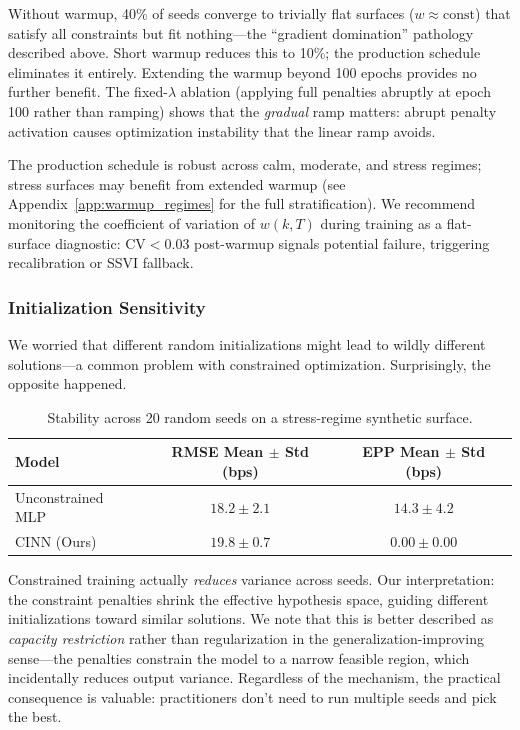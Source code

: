 \documentclass[11pt,a4paper]{article}
\begin{document}
Without warmup, 40\% of seeds converge to trivially flat surfaces ($w \approx \text{const}$) that satisfy all constraints but fit nothing---the ``gradient domination'' pathology described above. Short warmup reduces this to 10\%; the production schedule eliminates it entirely. Extending the warmup beyond 100 epochs provides no further benefit. The fixed-$\lambda$ ablation (applying full penalties abruptly at epoch 100 rather than ramping) shows that the \textit{gradual} ramp matters: abrupt penalty activation causes optimization instability that the linear ramp avoids.

The production schedule is robust across calm, moderate, and stress regimes; stress surfaces may benefit from extended warmup (see Appendix~\ref{app:warmup_regimes} for the full stratification). We recommend monitoring the coefficient of variation of $w(k, T)$ during training as a flat-surface diagnostic: $\text{CV} < 0.03$ post-warmup signals potential failure, triggering recalibration or SSVI fallback.

\subsubsection{Initialization Sensitivity}

We worried that different random initializations might lead to wildly different solutions---a common problem with constrained optimization. Surprisingly, the opposite happened.

\begin{table}[h]
\centering
\caption{Stability across 20 random seeds on a stress-regime synthetic surface.}
\label{tab:stability}
\begin{tabular}{lcc}
\toprule
\textbf{Model} & \textbf{RMSE Mean $\pm$ Std (bps)} & \textbf{EPP Mean $\pm$ Std (bps)} \\
\midrule
Unconstrained MLP & $18.2 \pm 2.1$ & $14.3 \pm 4.2$ \\
CINN (Ours) & $19.8 \pm 0.7$ & $0.00 \pm 0.00$ \\
\bottomrule
\end{tabular}
\end{table}

Constrained training actually \textit{reduces} variance across seeds. Our interpretation: the constraint penalties shrink the effective hypothesis space, guiding different initializations toward similar solutions. We note that this is better described as \textit{capacity restriction} rather than regularization in the generalization-improving sense---the penalties constrain the model to a narrow feasible region, which incidentally reduces output variance. Regardless of the mechanism, the practical consequence is valuable: practitioners don't need to run multiple seeds and pick the best.
\end{document}
